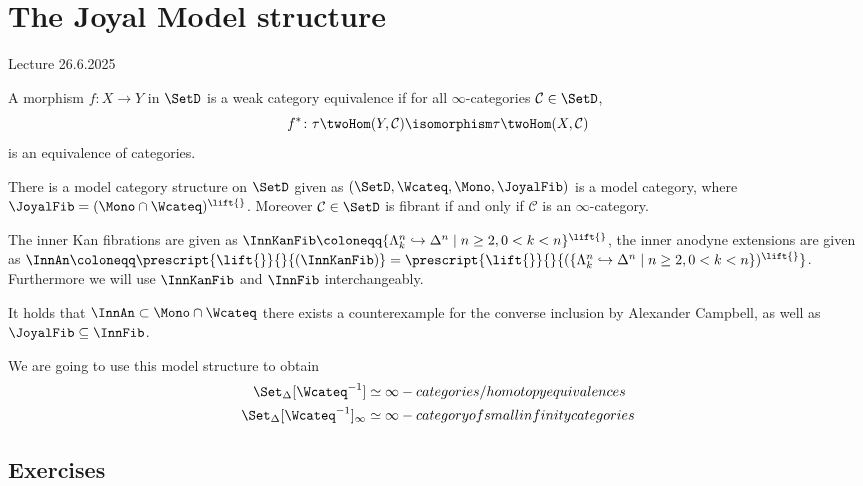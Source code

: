 \section{The Joyal Model structure}
Lecture 26.6.2025


\begin{defi}
	\cite[Thm 3.6.8]{Cisinski_2019}
	A morphism $ f \colon X \to Y $ in $ \SetD $ is a weak category equivalence if for all $ \infty $-categories $ \mathcal{ C } \in \SetD $,
	\[
		f^* \colon \tau \twoHom ( Y , \mathcal{ C } )
		\isomorphism 
		\tau \twoHom ( X , \mathcal{ C } )
	\]
	is an equivalence of categories.
\end{defi}

\begin{thm}
	There is a model category structure on $ \SetD $ given as $ ( \SetD , \Wcateq, \Mono , \JoyalFib ) $ is a model category,
	where $ \JoyalFib = ( \Mono \cap \Wcateq )^{ \lift{} }$.
	Moreover $ \mathcal{ C } \in \SetD $ is fibrant if and only if $ \mathcal{ C } $ is an $ \infty $-category.
\end{thm}

\begin{defi}
	The inner Kan fibrations are given as $ \InnKanFib \coloneqq \{ \Lambda_k^n \hookrightarrow \Delta^n \mid n \geq 2 , 0 < k < n \}^{ \lift{ } } $, the inner anodyne extensions are given as $ \InnAn \coloneqq \prescript{ \lift { } }{}{ ( \InnKanFib ) } = \prescript{ \lift{ } }{}{ ( \{ \Lambda_k^n \hookrightarrow \Delta^n \mid n \geq 2 , 0 < k < n \} )^{ \lift{} } } $.
	Furthermore we will use $ \InnKanFib $ and $ \InnFib $ interchangeably.
\end{defi}

\begin{Warning}
	It holds that $ \InnAn \subset \Mono \cap \Wcateq $ there exists a counterexample for the converse inclusion by Alexander Campbell, as well as $ \JoyalFib \subseteq \InnFib $.
\end{Warning}

We are going to use this model structure to obtain 
\begin{align*}
	\Set_\Delta [ \Wcateq^{ - 1 } ] &\simeq \infty-categories / homotopy equivalences
	\\
	\Set_\Delta [ \Wcateq^{ - 1 } ]_\infty &\simeq \infty-category of small infinity categories
\end{align*}

\subsection{Exercises}

